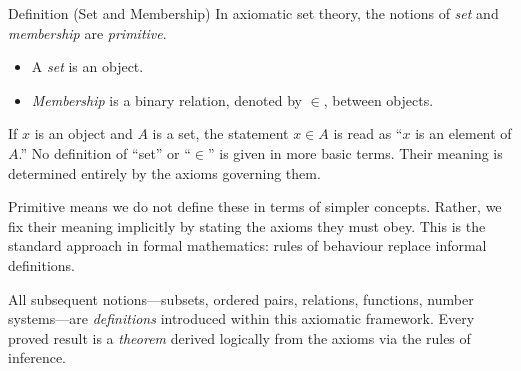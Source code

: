 \begin{propositionbox}{Definition (Set and Membership)}
\label{def:set-membership}
In axiomatic set theory, the notions of \emph{set} and \emph{membership} are
\emph{primitive}.

\begin{itemize}
  \item A \emph{set} is an object.
  \item \emph{Membership} is a binary relation, denoted by $\in$, between objects.
\end{itemize}

If $x$ is an object and $A$ is a set, the statement $x \in A$ is read as
``$x$ is an element of $A$.'' No definition of ``set'' or ``$\in$'' is given
in more basic terms. Their meaning is determined entirely by the axioms
governing them.
\end{propositionbox}

\begin{remark*}
Primitive means we do not define these in terms of simpler concepts.
Rather, we fix their meaning implicitly by stating the axioms they must obey.
This is the standard approach in formal mathematics: rules of behaviour replace
informal definitions.
\end{remark*}

\begin{remark*}[Consequence]
All subsequent notions---subsets, ordered pairs, relations, functions,
number systems---are \emph{definitions} introduced within this axiomatic
framework. Every proved result is a \emph{theorem} derived logically from the
axioms via the rules of inference.
\end{remark*}

